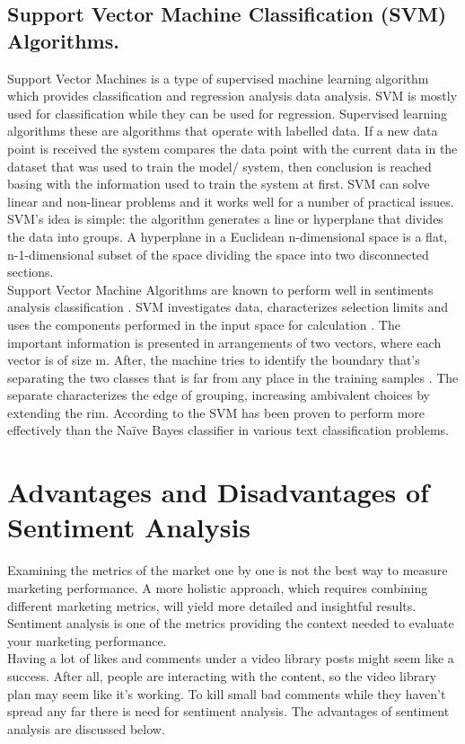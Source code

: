 \documentclass[12pt]{report}
\begin{document}
\subsection{Support Vector Machine Classification (SVM) Algorithms.}
Support Vector Machines is a type of supervised machine learning algorithm which provides classification and regression analysis data analysis. SVM is mostly used for classification while they can be used for regression.  Supervised learning algorithms these are algorithms that operate with labelled data. If a new data point is received the system compares the data point with the current data in the dataset that was used to train the model/ system, then conclusion is reached basing with the information used to train the system at first. SVM can solve linear and non-linear problems and it works well for a number of practical issues. SVM's idea is simple: the algorithm generates a line or hyperplane that divides the data into groups. A hyperplane in a Euclidean n-dimensional space is a flat, n-1-dimensional subset of the space dividing the space into two disconnected sections.\\
Support Vector Machine Algorithms are known to perform well in sentiments analysis classification \citep{abirami2017survey}. SVM investigates data, characterizes selection limits and uses the components performed in the input space for calculation \citep{harb2008web}. The important information is presented in arrangements of two vectors, where each vector is of size m. After, the machine tries to identify the boundary that’s separating the two classes that is far from any place in the training samples \citep{pang2002thumbs}. The separate characterizes the edge of grouping, increasing ambivalent choices by extending the rim. According to \cite{cherian2013providing} the SVM has been proven to perform more effectively than the Naïve Bayes classifier in various text classification problems.\\

\section{Advantages and Disadvantages of Sentiment Analysis}
Examining the metrics of the market one by one is not the best way to measure marketing performance. A more holistic approach, which requires combining different marketing metrics, will yield more detailed and insightful results. Sentiment analysis is one of the metrics providing the context needed to evaluate your marketing performance.\\
Having a lot of likes and comments under a video library posts might seem like a success. After all, people are interacting with the content, so the video library plan may seem like it’s working. To kill small bad comments while they haven’t spread any far there is need for sentiment analysis. The advantages of sentiment analysis are discussed below.\\
\end{document}
